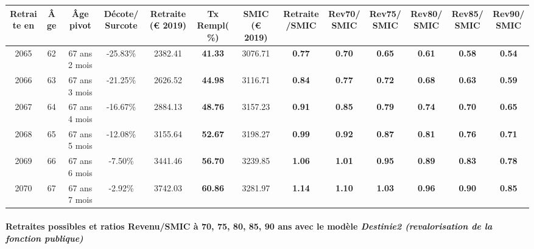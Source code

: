 { \scriptsize \begin{center} 
\begin{tabular}[htb]{|c|c||c|c||c|c||c||c|c|c|c|c|c|} 
\hline 
 Retraite en &  Âge &  Âge pivot &  Décote/Surcote &  Retraite (\euro{} 2019) &  Tx Rempl(\%) &  SMIC (\euro{} 2019) &  Retraite/SMIC &  Rev70/SMIC &  Rev75/SMIC &  Rev80/SMIC &  Rev85/SMIC &  Rev90/SMIC \\ 
\hline \hline 
 2065 &  62 &  67 ans 2 mois &  -25.83\% &  2382.41 &  {\bf 41.33} &  3076.71 &  {\bf {\color{red} 0.77}} &  {\bf {\color{red} 0.70}} &  {\bf {\color{red} 0.65}} &  {\bf {\color{red} 0.61}} &  {\bf {\color{red} 0.58}} &  {\bf {\color{red} 0.54}} \\ 
\hline 
 2066 &  63 &  67 ans 3 mois &  -21.25\% &  2626.52 &  {\bf 44.98} &  3116.71 &  {\bf {\color{red} 0.84}} &  {\bf {\color{red} 0.77}} &  {\bf {\color{red} 0.72}} &  {\bf {\color{red} 0.68}} &  {\bf {\color{red} 0.63}} &  {\bf {\color{red} 0.59}} \\ 
\hline 
 2067 &  64 &  67 ans 4 mois &  -16.67\% &  2884.13 &  {\bf 48.76} &  3157.23 &  {\bf {\color{red} 0.91}} &  {\bf {\color{red} 0.85}} &  {\bf {\color{red} 0.79}} &  {\bf {\color{red} 0.74}} &  {\bf {\color{red} 0.70}} &  {\bf {\color{red} 0.65}} \\ 
\hline 
 2068 &  65 &  67 ans 5 mois &  -12.08\% &  3155.64 &  {\bf 52.67} &  3198.27 &  {\bf {\color{red} 0.99}} &  {\bf {\color{red} 0.92}} &  {\bf {\color{red} 0.87}} &  {\bf {\color{red} 0.81}} &  {\bf {\color{red} 0.76}} &  {\bf {\color{red} 0.71}} \\ 
\hline 
 2069 &  66 &  67 ans 6 mois &  -7.50\% &  3441.46 &  {\bf 56.70} &  3239.85 &  {\bf 1.06} &  {\bf 1.01} &  {\bf {\color{red} 0.95}} &  {\bf {\color{red} 0.89}} &  {\bf {\color{red} 0.83}} &  {\bf {\color{red} 0.78}} \\ 
\hline 
 2070 &  67 &  67 ans 7 mois &  -2.92\% &  3742.03 &  {\bf 60.86} &  3281.97 &  {\bf 1.14} &  {\bf 1.10} &  {\bf 1.03} &  {\bf {\color{red} 0.96}} &  {\bf {\color{red} 0.90}} &  {\bf {\color{red} 0.85}} \\ 
\hline 
\hline 
\end{tabular} 
\end{center} } 
\paragraph{Retraites possibles et ratios Revenu/SMIC à 70, 75, 80, 85, 90 ans avec le modèle \emph{Destinie2 (revalorisation de la fonction publique)}}  
 
